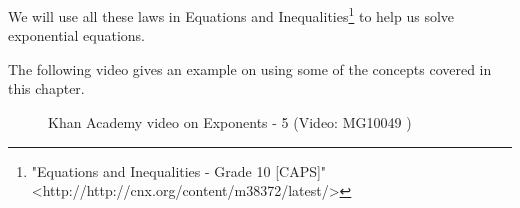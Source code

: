       \label{m38359*eip-117}We will use all these laws in Equations and Inequalities\footnote{\raggedright{}"Equations and Inequalities - Grade 10 [CAPS]" <http://http://cnx.org/content/m38372/latest/>} to help us solve exponential equations.\par \label{m38359*eip-160}The following video gives an example on using some of the concepts covered in this chapter.
    \setcounter{subfigure}{0}
	\begin{figure}[H] %
    \textnormal{Khan Academy video on Exponents - 5}\vspace{.1in} \nopagebreak
  \label{m38359*yt-media5}\label{m38359*yt-video5}
             { (Video:  MG10049 )}
      \vspace{2pt}
    \vspace{.1in}
 \end{figure}       \par 
